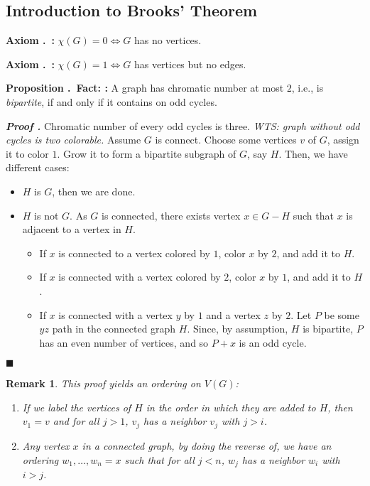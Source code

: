 \documentclass[12pt, letterpaper]{article}
\newcounter{index}[subsection]
\newenvironment*{ax}[1]{\par\noindent\textbf{Axiom \thesection.\stepcounter{index}\theindex\ #1:}}{\par}
\newenvironment*{prop}[1]{\par\noindent\textbf{Proposition \thesection.\stepcounter{index}\theindex\ #1:}}{\par}
\newcounter{nprf}[subsection]
\newenvironment*{prf}{\par\indent\textbf{\textit{Proof \stepcounter{nprf}\thenprf.}}}{\hfill$\blacksquare$\par}
\newtheorem{rmk}{Remark}[section]
\begin{document}
\subsection{Introduction to Brooks' Theorem}
\begin{ax}{}
	$\chi(G)=0\iff G$ has no vertices.	
\end{ax}
\begin{ax}{}
	$\chi(G)=1\iff G$ has vertices but no edges.
\end{ax}
\begin{prop}{Fact: }
	A graph has chromatic number at most $2$, i.e., is \textit{bipartite}, if and only if it contains on odd cycles.	
\end{prop}
\begin{prf}
	Chromatic number of every odd cycles is three. \textit{WTS: graph without	odd cycles is two colorable.} Assume $G$ is connect. Choose some vertices $v$ of $G$, assign it to color $1$. Grow it to form a bipartite subgraph of $G$, say $H$. Then, we have different cases: 
	\begin{itemize}
		\item $H$ is $G$, then we are done.
		\item $H$ is not $G$. As $G$ is connected, there exists vertex $x\in G-H$ such that $x$ is adjacent to a vertex in $H$.
		\begin{itemize}
			\item If $x$ is connected to a vertex colored by $1$, color $x$ by $2$, and add it to $H$.
			\item If $x$ is connected with a vertex colored by $2$, color $x$ by $1$, and add it to $H$.
			\item If $x$ is connected with a vertex $y$ by $1$ and a vertex $z$ by $2$. Let $P$ be some $yz$ path in the connected graph $H$. Since, by assumption, $H$ is bipartite, $P$ has an even number of vertices, and so $P+x$ is an odd cycle.
		\end{itemize}
	\end{itemize}
\end{prf}
\begin{rmk}
	This proof yields an ordering on $V(G)$: 
	\begin{enumerate}
		\item If we label the vertices of $H$ in the order in which they are added to $H$, then $v_1=v$ and for all $j>1$, $v_j$ has a neighbor $v_j$ with $j>i$.
		\item Any vertex $x$ in a connected graph, by doing the reverse of, we have an ordering $w_1,\dots,w_n=x$ such that for all $j<n$, $w_j$ has a neighbor $w_i$ with $i>j$.
	\end{enumerate}	
\end{rmk}
\end{document}
